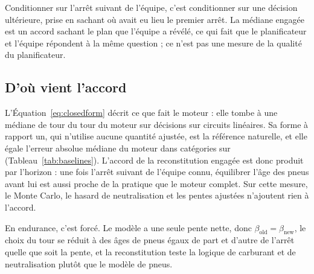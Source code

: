 \documentclass[11pt,a4paper]{article}
\begin{document}
Conditionner sur l'arrêt suivant de l'équipe, c'est conditionner sur une décision
ultérieure, prise en sachant où avait eu lieu le premier arrêt. La médiane
engagée est un accord sachant le plan que l'équipe a révélé, ce qui fait que le
planificateur et l'équipe répondent à la même question ; ce n'est pas une mesure
de la qualité du planificateur.

\subsection{D'où vient l'accord}
\label{sec:designchecks}

L'Équation~\ref{eq:closedform} décrit ce que fait le moteur : elle tombe à une
médiane de \ClosedFormGap{} tour du tour du moteur sur \ClosedFormN{} décisions
sur circuits linéaires. Sa forme à rapport un, qui n'utilise aucune quantité
ajustée, est la référence naturelle, et elle égale l'erreur absolue médiane du
moteur dans \RatioOneTies{} catégories sur \RatioOneClasses{}
(Tableau~\ref{tab:baselines}). L'accord de la reconstitution engagée est donc
produit par l'horizon : une fois l'arrêt suivant de l'équipe connu, équilibrer
l'âge des pneus avant lui est aussi proche de la pratique que le moteur complet.
Sur cette mesure, le Monte Carlo, le hasard de neutralisation et les pentes
ajustées n'ajoutent rien à l'accord.

En endurance, c'est forcé. Le modèle a une seule pente nette, donc
$\beta_{\mathrm{old}} = \beta_{\mathrm{new}}$, le choix du tour se réduit à des
âges de pneus égaux de part et d'autre de l'arrêt quelle que soit la pente, et la
reconstitution teste la logique de carburant et de neutralisation plutôt que le
modèle de pneus.
\end{document}
